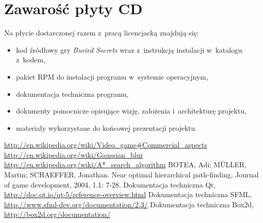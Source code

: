 \documentclass[licencjacka]{pracamgr}
\begin{document}
   
   
   

\chapter{Zawarość płyty CD}
  Na płycie dostarczonej razem z~pracą licencjacką znajdują się:
  \begin{itemize}
   \item kod źródłowy gry \emph{Buried Secrets} wraz z~instrukcją instalacji w~katalogu z~kodem,
   \item pakiet RPM do instalacji programu w~systemie operacyjnym,
   \item dokumentacja techniczna programu,
   \item dokumenty pomocnicze opisujące wizję, założenia i~architekturę projektu,
   \item materiały wykorzystane do końcowej prezentacji projektu.
  \end{itemize}

\begin{thebibliography}{99}

   \url{http://en.wikipedia.org/wiki/Video_game#Commercial_aspects}
   \url{http://en.wikipedia.org/wiki/Gaussian_blur}
   \url{http://en.wikipedia.org/wiki/A*_search_algorithm}
   BOTEA, Adi; MÜLLER, Martin; SCHAEFFER, Jonathan. Near optimal hierarchical path-finding. Journal of game development, 2004, 1.1: 7-28.
   Dokumentacja techniczna Qt, \url{http://doc.qt.io/qt-5/reference-overview.html}
   Dokumentacja techniczna SFML, \url{http://www.sfml-dev.org/documentation/2.3/}
   Dokumentacja techniczna Box2d, \url{http://box2d.org/documentation/}
  
  
\end{thebibliography}
\end{document}
